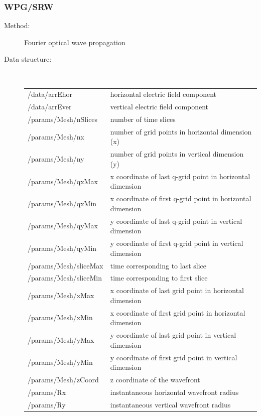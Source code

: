 \documentclass[12pt]{scrartcl}
\begin{document}
\subsubsection{WPG/SRW\label{sec:interface_prop_wpg}}
\begin{description}
  \item[Method:] Fourier optical wave propagation
  \item[Data structure:]\ \\
{\scriptsize%
\begin{tabular}{l|l}
  \hline
  \hline
  /data/arrEhor     & horizontal electric field component \\
  /data/arrEver     & vertical electric field component \\
  /params/Mesh/nSlices    & number of time slices \\
  /params/Mesh/nx     & number of grid points in horizontal dimension (x) \\
  /params/Mesh/ny     & number of grid points in vertical dimension (y) \\
  /params/Mesh/qxMax        & x coordinate of last q-grid point in horizontal
  dimension \\
  /params/Mesh/qxMin        & x coordinate of first q-grid point in horizontal
  dimension \\
  /params/Mesh/qyMax        & y coordinate of last q-grid point in vertical dimension \\
  /params/Mesh/qyMin        & y coordinate of first q-grid point in vertical
  dimension \\
  /params/Mesh/sliceMax     & time corresponding to last slice \\
  /params/Mesh/sliceMin     & time corresponding to first slice \\
  /params/Mesh/xMax     & x coordinate of last grid point in horizontal dimension \\
  /params/Mesh/xMin     & x coordinate of first grid point in horizontal dimension \\
  /params/Mesh/yMax     & y coordinate of last grid point in vertical dimension \\
  /params/Mesh/yMin     & y coordinate of first grid point in vertical dimension \\
  /params/Mesh/zCoord     & z coordinate of the wavefront \\
  /params/Rx    &  instantaneous horizontal wavefront radius\\
  /params/Ry    &  instantaneous vertical wavefront radius\\

\end{tabular}}
\end{description}
\end{document}
